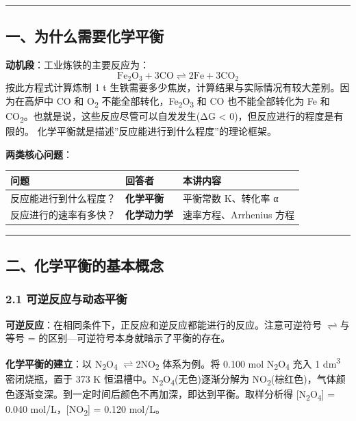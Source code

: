 \documentclass[a4paper,11pt]{ctexart}
\newcounter{none}
\newcommand{\箭}{\ensuremath{\rightarrow}}
\newcommand{\左箭}{\ensuremath{\leftarrow}}
\newcommand{\上箭}{\ensuremath{\uparrow}}
\newcommand{\下箭}{\ensuremath{\downarrow}}
\newcommand{\衡}{\ensuremath{\rightleftharpoons}}
\newcommand{\双箭}{\ensuremath{\leftrightarrow}}
\newcommand{\约等于}{\ensuremath{\approx}}
\newcommand{\小于等于}{\ensuremath{\leq}}
\newcommand{\大于等于}{\ensuremath{\geq}}
\newcommand{\不等于}{\ensuremath{\neq}}
\newcommand{\西格马}{\ensuremath{\sigma}}
\newcommand{\派}{\ensuremath{\pi}}
\begin{document}
\begin{center}\rule{0.5\linewidth}{0.5pt}\end{center}

\subsection{一、为什么需要化学平衡}\label{ux4e00ux4e3aux4ec0ux4e48ux9700ux8981ux5316ux5b66ux5e73ux8861}

\textbf{动机段}：工业炼铁的主要反应为：
\[\mathrm{Fe_2O_3 + 3CO \rightleftharpoons 2Fe + 3CO_2}\]
按此方程式计算炼制 1 t 生铁需要多少焦炭，计算结果与实际情况有较大差别。因为在高炉中 CO 和 O\textsubscript{2} 不能全部转化，Fe\textsubscript{2}O\textsubscript{3} 和 CO 也不能全部转化为 Fe 和 CO\textsubscript{2}。也就是说，这些反应尽管可以自发发生(ΔG \textless{} 0)，但反应进行的程度是有限的。
化学平衡就是描述''反应能进行到什么程度''的理论框架。

\textbf{两类核心问题}：

{\def\LTcaptype{none} %
\begin{longtable}[]{@{}lll@{}}
\toprule\noalign{}
问题 & 回答者 & 本讲内容 \\
\midrule\noalign{}
\endhead
\bottomrule\noalign{}
\endlastfoot
反应能进行到什么程度？ & \textbf{化学平衡} & 平衡常数 K、转化率 α \\
反应进行的速率有多快？ & \textbf{化学动力学} & 速率方程、Arrhenius 方程 \\
\end{longtable}
}

\begin{center}\rule{0.5\linewidth}{0.5pt}\end{center}

\subsection{二、化学平衡的基本概念}\label{ux4e8cux5316ux5b66ux5e73ux8861ux7684ux57faux672cux6982ux5ff5}

\subsubsection{2.1 可逆反应与动态平衡}\label{ux53efux9006ux53cdux5e94ux4e0eux52a8ux6001ux5e73ux8861}

\textbf{可逆反应}：在相同条件下，正反应和逆反应都能进行的反应。注意可逆符号 \衡 与等号 = 的区别---可逆符号本身就暗示了平衡的存在。

\textbf{化学平衡的建立}：以 N\textsubscript{2}O\textsubscript{4} \衡 2NO\textsubscript{2} 体系为例。将 0.100 mol N\textsubscript{2}O\textsubscript{4} 充入 1 dm\textsuperscript{3} 密闭烧瓶，置于 373 K 恒温槽中。N\textsubscript{2}O\textsubscript{4}(无色)逐渐分解为 NO\textsubscript{2}(棕红色)，气体颜色逐渐变深。到一定时间后颜色不再加深，即达到平衡。取样分析得 {[}N\textsubscript{2}O\textsubscript{4}{]} = 0.040 mol/L，{[}NO\textsubscript{2}{]} = 0.120 mol/L。
\end{document}
